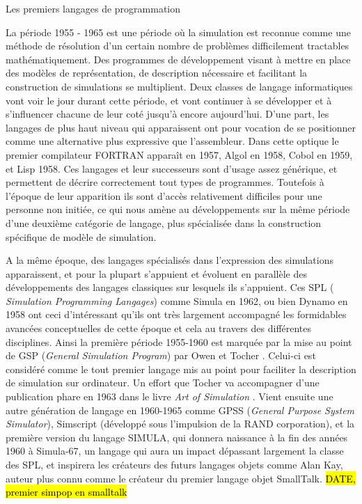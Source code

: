 \begin{framewithtitle}{ Les premiers langages de programmation }

La période 1955 - 1965 est une période où la simulation est reconnue comme une méthode de résolution d'un certain nombre de problèmes difficilement tractables mathématiquement.\autocite{Nance1993, Ackoff1961} Des programmes de développement visant à mettre en place des modèles de représentation, de description nécessaire et facilitant la construction de simulations se multiplient. Deux classes de langage informatiques vont voir le jour durant cette période, et vont continuer à se développer et à s'influencer chacune de leur coté jusqu'à encore aujourd'hui. D'une part, les langages de plus haut niveau qui apparaissent ont pour vocation de se positionner comme une alternative plus expressive que l'assembleur. Dans cette optique le premier compilateur FORTRAN apparaît en 1957,  Algol en 1958, Cobol en 1959, et Lisp 1958. Ces langages et leur successeurs sont d'usage assez générique, et permettent de décrire correctement tout types de programmes. Toutefois à l'époque de leur apparition ils sont d'accès relativement difficiles pour une personne non initiée, ce qui nous amène au développements sur la même période d'une deuxième catégorie de langage, plus spécialisée dans la construction spécifique de modèle de simulation. \autocite[239]{Naylor1966}

A la même époque, des langages spécialisés dans l'expression des simulations apparaissent, et pour la plupart s'appuient et évoluent en parallèle des développements des langages classiques sur lesquels ils s'appuient. Ces SPL ( \textit{Simulation Programming Langages}) comme Simula en 1962, ou bien Dynamo en 1958 ont ceci d'intéressant qu'ils ont très largement accompagné les formidables avancées conceptuelles de cette époque et cela au travers des différentes disciplines. Ainsi la première période 1955-1960 est marquée par la mise au point de GSP (\textit{General Simulation Program}) par Owen et Tocher \autocite{Tocher1960}. Celui-ci est considéré comme le tout premier langage mis au point pour faciliter la description de simulation sur ordinateur. Un effort que Tocher va accompagner d'une publication phare en 1963 dans le livre \textit{Art of Simulation} \autocite{Tocher1963} . Vient ensuite une autre génération de langage en 1960-1965 comme GPSS (\textit{General Purpose System Simulator}), Simscript (développé sous l'impulsion de la RAND corporation), et la première version du langage SIMULA, qui donnera naissance à la fin des années 1960 à Simula-67, un langage qui aura un impact dépassant largement la classe des SPL, et inspirera les créateurs des futurs langages objets comme Alan Kay, auteur plus connu comme le créateur du premier langage objet SmallTalk. \hl{DATE, premier simpop en smalltalk}

\end{framewithtitle}


